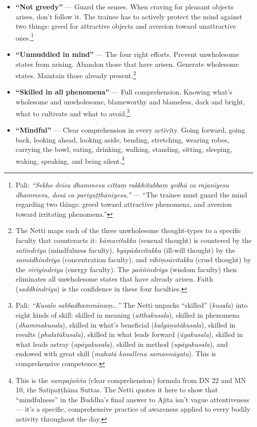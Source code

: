 \begin{itemize}[itemsep=4pt]
\item \textbf{``Not greedy''} --- Guard the senses. When craving for pleasant objects arises, don't follow it. The trainee has to actively protect the mind against two things: greed for attractive objects and aversion toward unattractive ones.\footnote{Pali: \textit{``Sekho dvīsu dhammesu cittaṃ rakkhitabbaṃ gedhā ca rajanīyesu dhammesu, dosā ca pariyuṭṭhānīyesu.''} --- ``The trainee must guard the mind regarding two things: greed toward attractive phenomena, and aversion toward irritating phenomena.''}

\item \textbf{``Unmuddied in mind''} --- The four right efforts. Prevent unwholesome states from arising. Abandon those that have arisen. Generate wholesome states. Maintain those already present.\footnote{The Netti maps each of the three unwholesome thought-types to a specific faculty that counteracts it: \textit{kāmavitakka} (sensual thought) is countered by the \textit{satindriya} (mindfulness faculty), \textit{byāpādavitakka} (ill-will thought) by the \textit{samādhindriya} (concentration faculty), and \textit{vihiṃsāvitakka} (cruel thought) by the \textit{vīriyindriya} (energy faculty). The \textit{paññindriya} (wisdom faculty) then eliminates all unwholesome states that have already arisen. Faith (\textit{saddhindriya}) is the confidence in these four faculties.}

\item \textbf{``Skilled in all phenomena''} --- Full comprehension. Knowing what's wholesome and unwholesome, blameworthy and blameless, dark and bright, what to cultivate and what to avoid.\footnote{Pali: \textit{``Kusalo sabbadhammānaṃ\ldots''} The Netti unpacks ``skilled'' (\textit{kusala}) into eight kinds of skill: skilled in meaning (\textit{atthakusala}), skilled in phenomena (\textit{dhammakusala}), skilled in what's beneficial (\textit{kalyāṇatākusala}), skilled in results (\textit{phalatākusala}), skilled in what leads forward (\textit{āyakusala}), skilled in what leads astray (\textit{apāyakusala}), skilled in method (\textit{upāyakusala}), and endowed with great skill (\textit{mahatā kosallena samannāgata}). This is comprehensive competence.}

\item \textbf{``Mindful''} --- Clear comprehension in every activity. Going forward, going back, looking ahead, looking aside, bending, stretching, wearing robes, carrying the bowl, eating, drinking, walking, standing, sitting, sleeping, waking, speaking, and being silent.\footnote{This is the \textit{sampajañña} (clear comprehension) formula from DN 22 and MN 10, the Satipaṭṭhāna Suttas. The Netti quotes it here to show that ``mindfulness'' in the Buddha's final answer to Ajita isn't vague attentiveness --- it's a specific, comprehensive practice of awareness applied to every bodily activity throughout the day.}
\end{itemize}

